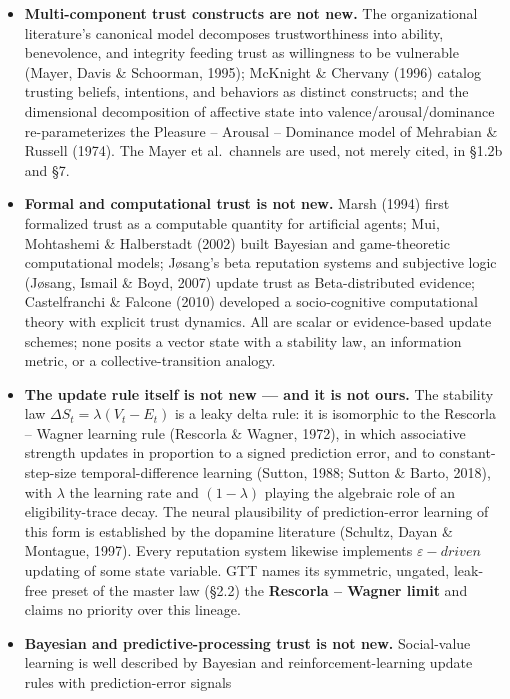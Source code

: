 \documentclass[
]{article}
\newcounter{none} %
\begin{document}
\begin{itemize}
\item
  \textbf{Multi-component trust constructs are not new.} The
  organizational literature's canonical model decomposes trustworthiness
  into ability, benevolence, and integrity feeding trust as willingness
  to be vulnerable (Mayer, Davis \& Schoorman, 1995); McKnight \&
  Chervany (1996) catalog trusting beliefs, intentions, and behaviors as
  distinct constructs; and the dimensional decomposition of affective
  state into valence/arousal/dominance re-parameterizes the Pleasure --
  Arousal -- Dominance model of Mehrabian \& Russell (1974). The Mayer
  et al.~channels are used, not merely cited, in §1.2b and §7.
\item
  \textbf{Formal and computational trust is not new.} Marsh (1994) first
  formalized trust as a computable quantity for artificial agents; Mui,
  Mohtashemi \& Halberstadt (2002) built Bayesian and game-theoretic
  computational models; Jøsang's beta reputation systems and subjective
  logic (Jøsang, Ismail \& Boyd, 2007) update trust as Beta-distributed
  evidence; Castelfranchi \& Falcone (2010) developed a socio-cognitive
  computational theory with explicit trust dynamics. All are scalar or
  evidence-based update schemes; none posits a vector state with a
  stability law, an information metric, or a collective-transition
  analogy.
\item
  \textbf{The update rule itself is not new --- and it is not ours.} The
  stability law \(\Delta S_t = \lambda(V_t - E_t)\) is a leaky delta
  rule: it is isomorphic to the Rescorla -- Wagner learning rule
  (Rescorla \& Wagner, 1972), in which associative strength updates in
  proportion to a signed prediction error, and to constant-step-size
  temporal-difference learning (Sutton, 1988; Sutton \& Barto, 2018),
  with \(\lambda\) the learning rate and \((1 - \lambda)\) playing the
  algebraic role of an eligibility-trace decay. The neural plausibility
  of prediction-error learning of this form is established by the
  dopamine literature (Schultz, Dayan \& Montague, 1997). Every
  reputation system likewise implements \(\varepsilon-driven\) updating
  of some state variable. GTT names its symmetric, ungated, leak-free
  preset of the master law (§2.2) the \textbf{Rescorla -- Wagner limit}
  and claims no priority over this lineage.
\item
  \textbf{Bayesian and predictive-processing trust is not new.}
  Social-value learning is well described by Bayesian and
  reinforcement-learning update rules with prediction-error signals

\end{itemize}
\end{document}
